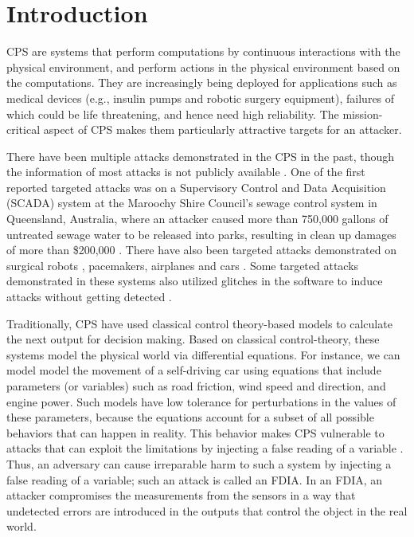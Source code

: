
\chapter{Introduction }
\label{ch:Chapter1}
\ac{CPS} are systems that perform computations by continuous interactions with the physical environment, and perform actions in the physical environment based on the computations.   
They are increasingly being deployed for applications \cite{10.1145/2038642.2038685}\cite{10.1145/1837274.1837463}\cite{6051465} such as medical devices (e.g., insulin pumps and robotic surgery equipment), failures of which could be life threatening, and hence need high reliability. 
The mission-critical aspect of \ac{CPS} makes them particularly attractive targets for an attacker. 

There have been multiple attacks demonstrated in the \ac{CPS} in the past, though the information of most attacks is not publicly available \cite{doi:10.1080/13518040590969785}.
One of the first reported targeted attacks was on a Supervisory Control and Data Acquisition (SCADA) system \cite{article22} at the Maroochy Shire Council’s sewage control system in Queensland, Australia, where an attacker caused more than 750,000 gallons of untreated sewage water to be released into parks, resulting in clean up damages of more than \$200,000 \cite{10.1016/j.adhoc.2009.04.012}.
There have also been targeted attacks demonstrated on surgical robots \cite{7579758}, pacemakers\cite{4531149}, airplanes \cite{217595} and  cars \cite{10.5555/1929820.1929848}.
Some targeted attacks demonstrated in these systems also utilized glitches in the software to induce attacks without getting detected \cite{242054}. 


Traditionally, \ac{CPS} have used classical control theory-based models \cite{6051465} \cite{1337806} \cite{10.1145/2038642.2038667}  to calculate the next output for decision making. 
Based on classical control-theory, these systems model the physical world via differential equations. 
For instance, we can model model the movement of a self-driving car using equations that include parameters (or variables) such as road friction, wind speed and direction, and engine power. 
Such models have low tolerance for perturbations in the values of these parameters, because the equations account for a subset of all possible behaviors that can happen in reality. 
This behavior makes \ac{CPS} vulnerable to attacks that can exploit the limitations by injecting a false reading of a variable \cite{10.1145/1952982.1952995}. 
Thus, an adversary can cause irreparable harm to such a system by injecting a false reading of a variable; such an attack is called an \ac{FDIA}.
 In an \ac{FDIA}, an attacker compromises the measurements from the sensors in a way that undetected errors are introduced in the outputs \cite{7438916} that control the object in the real world. 
 
